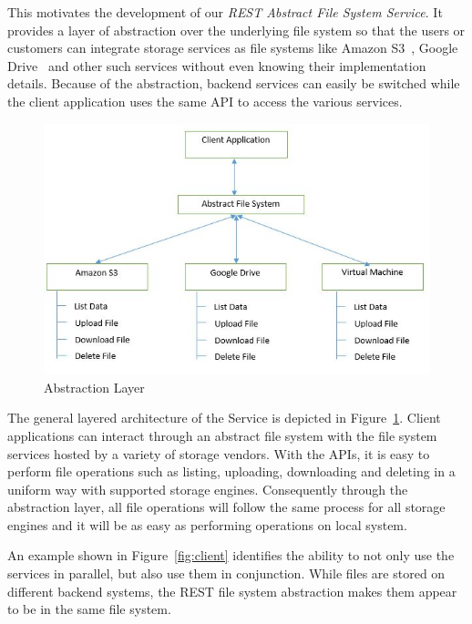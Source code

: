 This motivates the development of our \emph{REST Abstract File System
 Service}. It provides a layer of abstraction over the underlying
file system so that the users or customers can integrate storage
services as file systems like Amazon S3~\cite{hid-sp18-420-amazon-S3},
Google Drive~\cite{hid-sp18-420-google-drive} and other such services
without even knowing their implementation details. Because of the
abstraction, backend services can easily be switched while the client
application uses the same API to access the various services.


\begin{figure}[!ht]
        \centering\includegraphics[width=\columnwidth]
        {image/architecture.JPG}
        \caption{Abstraction Layer}\label{fig:architecture}
\end{figure}

The general layered architecture of the Service is depicted in
Figure~\ref{fig:architecture}. Client applications can interact
through an abstract file system with the file system services hosted
by a variety of storage vendors. With the APIs, it is easy to perform
file operations such as listing, uploading, downloading and deleting
in a uniform way with supported storage engines. Consequently through
the abstraction layer, all file operations will follow the same
process for all storage engines and it will be as easy as performing
operations on local system.

An example shown in Figure~\ref{fig:client} identifies the ability to
not only use the services in parallel, but also use them in
conjunction. While files are stored on different backend systems, the
REST file system abstraction makes them appear to be in the same file
system.

